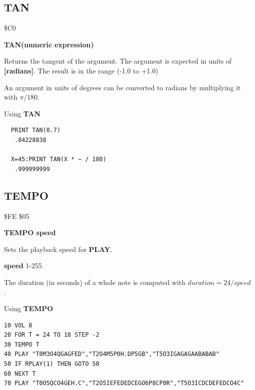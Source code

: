 
\newpage
\subsection{TAN}
\begin{description}[leftmargin=2cm,style=nextline]
\item [Token:] \$C0
\item [Format:] {\bf TAN(numeric expression)}
\item [Usage:] Returns the tangent of the
               argument.
               The argument is expected in units of {\bf [radians]}.
               The result is in the range (-1.0 to +1.0)

\item [Remarks:] An argument in units of degrees
                 can be converted to radians
                 by multiplying it with $\pi/180$.
\item [Example:] Using {\bf TAN}
\begin{tcolorbox}[colback=black,coltext=white]
\verbatimfont{\codefont}
\begin{verbatim}
  PRINT TAN(0.7)
   .84228838

  X=45:PRINT TAN(X * ~ / 180)
   .999999999
\end{verbatim}
\end{tcolorbox}
\end{description}


\newpage
\subsection{TEMPO}
\begin{description}[leftmargin=2cm,style=nextline]
\item [Token:] \$FE \$05
\item [Format:] {\bf TEMPO speed}
\item [Usage:] Sets the playback speed for {\bf PLAY}.

               {\bf speed} 1-255.

               The duration (in seconds) of a whole note is computed with
               $ duration = 24 / speed $.

\item [Example:] Using {\bf TEMPO}
\begin{tcolorbox}[colback=black,coltext=white]
\verbatimfont{\codefont}
\begin{verbatim}
10 VOL 8
20 FOR T = 24 TO 18 STEP -2
30 TEMPO T
40 PLAY "T0M3O4QGAGFED","T2O4M5P0H.DP5GB","T5O3IGAGAGAABABAB"
50 IF RPLAY(1) THEN GOTO 50
60 NEXT T
70 PLAY "T0O5QCO4GEH.C","T2O5IEFEDEDCEGO6P8CP0R","T5O3ICDCDEFEDCO4C"
\end{verbatim}
\end{tcolorbox}
\end{description}


